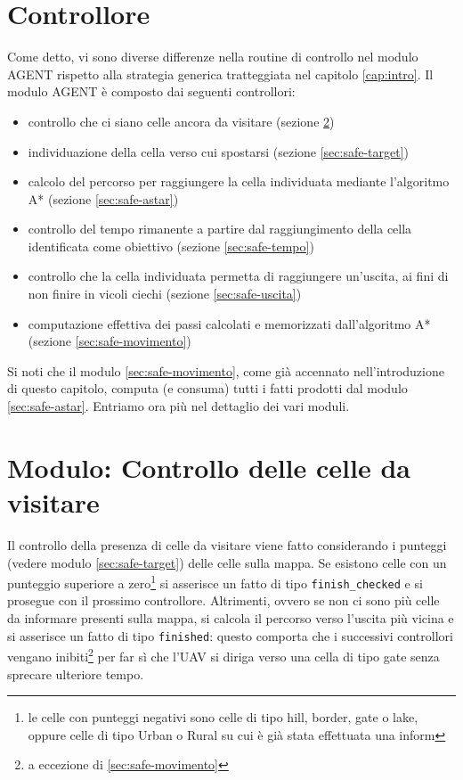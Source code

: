 \section{Controllore} \label{sec:safe-controllore}
Come detto, vi sono diverse differenze nella routine di controllo nel modulo AGENT rispetto alla strategia generica tratteggiata nel capitolo \ref{cap:intro}. Il modulo AGENT è composto dai seguenti controllori:
\begin{itemize}
	\item controllo che ci siano celle ancora da visitare (sezione \ref{sec:safe-finish})
	\item individuazione della cella verso cui spostarsi (sezione \ref{sec:safe-target})
	\item calcolo del percorso per raggiungere la cella individuata mediante l'algoritmo A* (sezione \ref{sec:safe-astar})
	\item controllo del tempo rimanente a partire dal raggiungimento della cella identificata come obiettivo (sezione \ref{sec:safe-tempo})
	\item controllo che la cella individuata permetta di raggiungere un'uscita, ai fini di non finire in vicoli ciechi (sezione \ref{sec:safe-uscita})
	\item computazione effettiva dei passi calcolati e memorizzati dall'algoritmo A* (sezione \ref{sec:safe-movimento})
\end{itemize}
Si noti che il modulo \ref{sec:safe-movimento}, come già accennato nell'introduzione di questo capitolo, computa (e consuma) tutti i fatti prodotti dal modulo \ref{sec:safe-astar}. Entriamo ora più nel dettaglio dei vari moduli.

\section{Modulo: Controllo delle celle da visitare} \label{sec:safe-finish}
Il controllo della presenza di celle da visitare viene fatto considerando i punteggi (vedere modulo \ref{sec:safe-target}) delle celle sulla mappa. Se esistono celle con un punteggio superiore a zero\footnote{le celle con punteggi negativi sono celle di tipo hill, border, gate o lake, oppure celle di tipo Urban o Rural su cui è già stata effettuata una inform} si asserisce un fatto di tipo \texttt{finish\_checked} e si prosegue con il prossimo controllore. Altrimenti, ovvero se non ci sono più celle da informare presenti sulla mappa, si calcola il percorso verso l'uscita più vicina e si asserisce un fatto di tipo \texttt{finished}: questo comporta che i successivi controllori vengano inibiti\footnote{a eccezione di \ref{sec:safe-movimento}} per far sì che l'UAV si diriga verso una cella di tipo gate senza sprecare ulteriore tempo.

